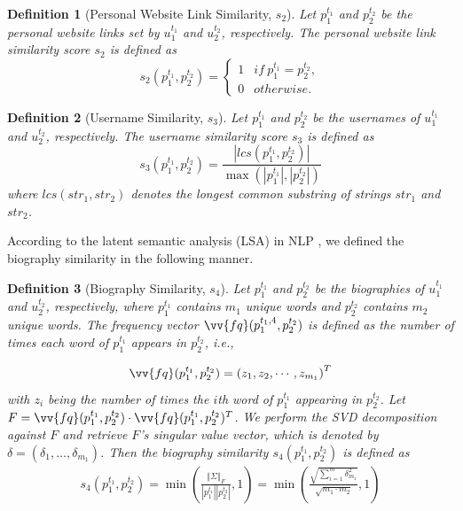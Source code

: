 \documentclass[letterpaper,12pt]{article}
\newtheorem{definition}{Definition}
\begin{document}
\noindent \theoremstyle{definition}
\begin{definition}[Personal Website Link Similarity, $s_2$]
Let $p_{1}^{t_1}$ and $p_{2}^{t_2}$ be the personal website links set by $u_{1}^{t_1}$ and $u_{2}^{t_2}$, respectively. The personal website link similarity score $s_2$ is defined as
\begin{equation}
s_2(p_{1}^{t_1},p_{2}^{t_2})=
\begin{cases}
1 & if\ p_{1}^{t_1}=p_{2}^{t_2},\\
0 & otherwise.
\end{cases}
\end{equation}
\label{def:pw}
\end{definition}

\noindent \theoremstyle{definition}
\begin{definition}[Username Similarity, $s_3$]
Let $p_{1}^{t_1}$ and $p_{2}^{t_2}$ be the usernames of $u_{1}^{t_1}$ and $u_{2}^{t_2}$, respectively. The username similarity score $s_3$ is defined as
\begin{equation}
s_3(p_{1}^{t_1}, p_{2}^{t_2})=\frac{|lcs(p_{1}^{t_1},p_{2}^{t_2})|}{\max(|p_{1}^{t_1}|,|p_{2}^{t_2}|)}
\end{equation}
where $lcs(str_1,str_2)$ denotes the \emph{longest common substring} of strings $str_1$ and $str_2$.
\label{def:user}
\end{definition}

\noindent According to the latent semantic analysis (LSA) in NLP \cite{landauer1998introduction}, we defined the biography similarity in the following manner.
\noindent
\begin{definition}[Biography Similarity, $s_4$]
Let $p_{1}^{t_1}$ and $p_{2}^{t_2}$ be the biographies of $u_{1}^{t_1}$ and $u_{2}^{t_2}$, respectively, where $p_{1}^{t_1}$ contains $m_1$ unique words and $p_{2}^{t_2}$ contains $m_2$ unique words. The frequency vector $\vv{fq}(p_{1}^{t_1,4},p_{2}^{t_2})$ is defined as the number of times each word of $p_{1}^{t_1}$ appears in $p_{2}^{t_2}$, i.e., 

$$\vv{fq}(p_{1}^{t_1},p_{2}^{t_2})=\left( 
z_{1},
z_{2},
\cdots,
z_{m_1}
\right)^T$$
with $z_i$ being the number of times the $i$th word of $p_{1}^{t_1}$ appearing in $p_{2}^{t_2}$.
%
Let $F=\vv{fq}(p_{1}^{t_1},p_{2}^{t_2})\cdot \vv{fq}(p_{1}^{t_1},p_{2}^{t_2})^{T}$.  We perform the SVD decomposition against $F$ and retrieve $F$'s singular value vector, which is denoted by $\delta=(\delta_1,\dots,\delta_{m_1})$. Then
the biography similarity $s_4(p_{1}^{t_1},p_{2}^{t_2})$ is defined as
\begin{equation}
\begin{gathered}
s_4(p_{1}^{t_1},p_{2}^{t_2})= \min(\frac{\left\Vert \varSigma\right\Vert _{F}}{\left|p_{1}^{t_1}\right|\left|p_{2}^{t_2}\right|},1)=\min(\frac{\sqrt{\sum_{i=1}^{m}\delta_{m_1}^{2}}}{\sqrt{m_1\cdot m_2}},1)
\end{gathered}
\end{equation}
\label{def:bio}
\end{definition}
\end{document}
